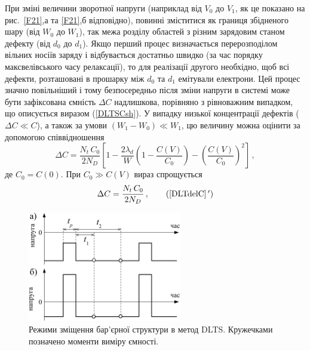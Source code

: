 \documentclass[10pt,a5paper,titlepage,oneside]{book}
\numberwithin{equation}{part}
\renewcommand{\theequation}{\thechapter.\arabic{equation}}
\begin{document}
При зміні величини зворотної напруги (наприклад від $V_0$ до $V_1$,
як це показано на рис.~\ref{F21},а та \ref{F21},б відповідно),
повинні зміститися як границя збідненого шару (від $W_0$ до $W_1$),
так межа розділу областей з різним зарядовим станом дефекту (від $d_0$ до $d_1$).
Якщо перший процес визначається перерозподілом
вільних носіїв заряду і відбувається достатньо швидко (за час порядку максвелівського часу релаксації),
то для реалізації другого необхідно, щоб всі дефекти, розташовані в прошарку
між $d_0$ та $d_1$ емітували електрони.
Цей процес значно повільніший і тому безпосередньо після зміни напруги
в системі може бути зафіксована ємність $\Delta C$ надлишкова, порівняно з рівноважним випадком, що
описується виразом (\ref{DLTSCsh}).
У випадку низької концентрації дефектів ($\Delta C\ll C$), а також за умови $(W_1-W_0)\ll W_1$,
цю величину можна оцінити за допомогою співвідношення \cite{tuomisto2019}
\begin{equation}
\label{DLTdelC}
\Delta C=\frac{N_t\,C_0}{2N_D}\left[1-\frac{2\lambda_d}{W}\left(1-\frac{C(V)}{C_0}\right)-\left(\frac{C(V)}{C_0}\right)^2\right]\,,
\end{equation}
де
$C_0=C(0)$.
При $C_0\gg C(V)$ вираз спрощується
\begin{equation}
\label{DLTdelC*}
\Delta C=\frac{N_t\,C_0}{2N_D} \,,\tag{\ref{DLTdelC}\,$'$}
\end{equation}


\begin{figure}[b]
\center
\vspace{-5mm}
\includegraphics[width=0.6\textwidth]{Fig2_2}
\vspace{-3mm}
\caption{Режими зміщення бар'єрної структури в метод DLTS.
Кружечками позначено моменти виміру ємності.
}
\vspace{-3mm}
\label{F22}
\end{figure}
\end{document}
